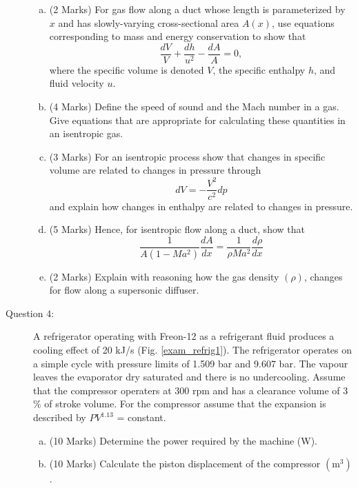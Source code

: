 \documentclass[12pt,twoside]{report}
\newcommand{\frc}{\displaystyle\frac}
\begin{document}
\begin{description}
\begin{enumerate}[(a)]
%
\item (2 Marks) For gas flow along a duct whose length is parameterized by $x$ and has slowly-varying cross-sectional area  $A(x)$, use equations corresponding to mass and energy conservation to show that
\begin{displaymath}
\frc{dV}{V} + \frc{d h}{u^{2}} - \frc{dA}{A}=0,
\end{displaymath}
where the specific volume is denoted $V$, the specific enthalpy $h$, and fluid velocity $u$.
\medskip

\item (4 Marks) Define the speed of sound and the Mach number in a gas. Give equations that are appropriate for calculating these quantities in an isentropic gas.
\medskip

\item (3 Marks) For an isentropic process show that changes in specific volume are related to changes in pressure through
\begin{displaymath}
dV=-\frc{V^{2}}{c^{2}}dp
\end{displaymath}
and explain how changes in enthalpy are related to changes in pressure. 
\medskip

\item (5 Marks) Hence, for isentropic flow along a duct, show that
\begin{displaymath}
\frc{1}{A\left(1-Ma^{2}\right)}\frc{dA}{dx} = \frc{1}{\rho M a^{2}}\frc{d\rho}{dx}
\end{displaymath}
\medskip

\item (2 Marks) Explain with reasoning how the gas density $\left(\rho\right)$, changes for flow along a supersonic diffuser.
%
\end{enumerate}

\item [Question 4:] A refrigerator operating with Freon-12 as a refrigerant fluid produces a cooling effect of 20 kJ/s (Fig. \ref{exam_refrig1}). The refrigerator operates on a simple cycle with pressure limits of 1.509 bar and 9.607 bar. The vapour leaves the evaporator dry saturated and there is no undercooling.  Assume that the compressor operaters at 300 rpm and has a clearance volume of 3$\%$ of stroke volume.  For the compressor assume that the expansion is described by $PV^{1.13}$ = constant. 
\begin{enumerate}[(a)]
\item (10 Marks) Determine the power required by the machine (W).
\item (10 Marks) Calculate the piston displacement of the compressor $\left(\text{m}^{3}\right)$. 
\end{enumerate}


\end{description}
\end{document}
